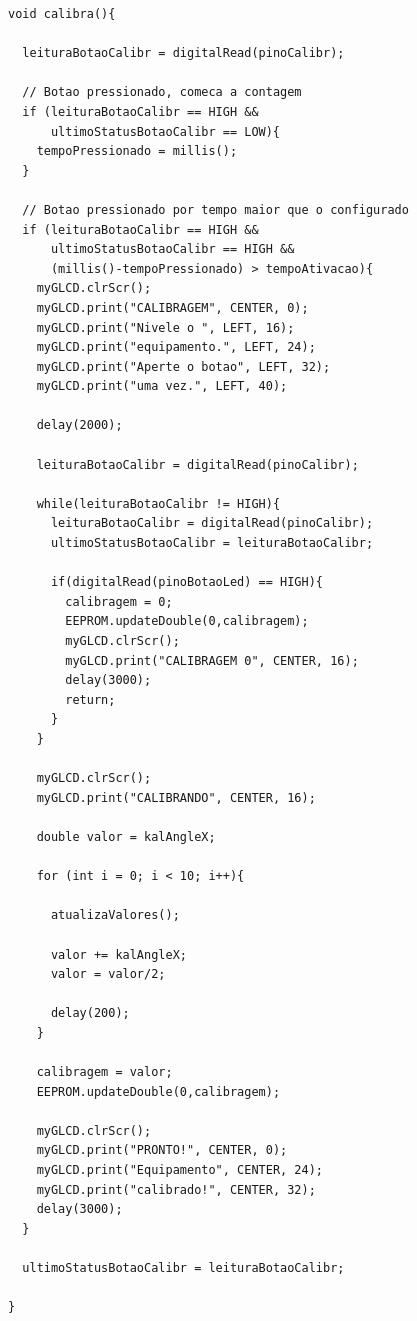 \documentclass[a4paper,12pt]{article}
\begin{document}
{\singlespace\begin{lstlisting}
void calibra(){

  leituraBotaoCalibr = digitalRead(pinoCalibr);

  // Botao pressionado, comeca a contagem
  if (leituraBotaoCalibr == HIGH && 
      ultimoStatusBotaoCalibr == LOW){
    tempoPressionado = millis();
  }
  
  // Botao pressionado por tempo maior que o configurado
  if (leituraBotaoCalibr == HIGH &&
      ultimoStatusBotaoCalibr == HIGH && 
      (millis()-tempoPressionado) > tempoAtivacao){
    myGLCD.clrScr();
    myGLCD.print("CALIBRAGEM", CENTER, 0);
    myGLCD.print("Nivele o ", LEFT, 16);
    myGLCD.print("equipamento.", LEFT, 24);
    myGLCD.print("Aperte o botao", LEFT, 32);
    myGLCD.print("uma vez.", LEFT, 40);

    delay(2000);

    leituraBotaoCalibr = digitalRead(pinoCalibr);

    while(leituraBotaoCalibr != HIGH){
      leituraBotaoCalibr = digitalRead(pinoCalibr);
      ultimoStatusBotaoCalibr = leituraBotaoCalibr;
      
      if(digitalRead(pinoBotaoLed) == HIGH){
        calibragem = 0;
        EEPROM.updateDouble(0,calibragem);
        myGLCD.clrScr();
        myGLCD.print("CALIBRAGEM 0", CENTER, 16);
        delay(3000);
        return;
      }
    }
    
    myGLCD.clrScr();
    myGLCD.print("CALIBRANDO", CENTER, 16);
    
    double valor = kalAngleX;
    
    for (int i = 0; i < 10; i++){
      
      atualizaValores();
      
      valor += kalAngleX;
      valor = valor/2;
      
      delay(200);
    }
    
    calibragem = valor;
    EEPROM.updateDouble(0,calibragem);

    myGLCD.clrScr();    
    myGLCD.print("PRONTO!", CENTER, 0);
    myGLCD.print("Equipamento", CENTER, 24);
    myGLCD.print("calibrado!", CENTER, 32);
    delay(3000);
  }
  
  ultimoStatusBotaoCalibr = leituraBotaoCalibr;

}
\end{lstlisting}}
\end{document}

